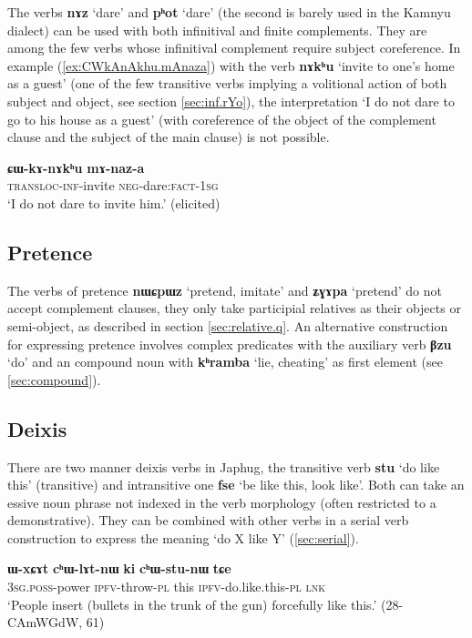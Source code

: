 \documentclass[oneside,a4paper,11pt]{article}
\newcommand{\ipa}[1]{\textbf{\phon#1}} %
\newcommand{\jpg}[2]{\ipa{#1} `#2'} %
\newcommand{\refb}[1]{(\ref{#1})}
\begin{document}
The verbs \jpg{nɤz}{dare} and \jpg{pʰot}{dare} (the second is barely used in the Kamnyu dialect) can be used with both infinitival and finite complements. They are among the few verbs whose infinitival complement require subject coreference. In example \refb{ex:CWkAnAkhu.mAnaza}  with the verb  \jpg{nɤkʰu}{invite to one's home as a guest} (one of the few transitive verbs implying a volitional action of both subject and object, see section \ref{sec:inf.rYo}), the interpretation `I do not dare to go to his house as a guest' (with coreference of the object of the complement clause and the subject of the main clause) is not possible.

\begin{exe}
\ex \label{ex:CWkAnAkhu.mAnaza}
\gll 
\ipa{ɕɯ-kɤ-nɤkʰu} \ipa{mɤ-naz-a} \\
\textsc{transloc-inf}-invite \textsc{neg}-dare:\textsc{fact-1sg} \\
\glt `I do not dare to invite him.' (elicited)
\end{exe}

\subsection{Pretence} \label{sec:pretence}
The verbs of pretence \jpg{nɯɕpɯz}{pretend, imitate} and \jpg{ʑɣɤpa}{pretend} do not accept complement clauses, they only take participial relatives as their objects or semi-object, as described in section \ref{sec:relative.q}. An alternative construction for expressing pretence involves complex predicates with the auxiliary verb \jpg{βzu}{do} and an compound noun with \jpg{kʰramba}{lie, cheating} as first element (see \ref{sec:compound}).

  \subsection{Deixis} \label{sec:deixis}
 There are two manner deixis verbs in Japhug, the transitive verb \jpg{stu}{do like this} (transitive) and intransitive one \jpg{fse}{be like this, look like}. Both can take an essive noun phrase not indexed in the verb morphology (often restricted to a demonstrative). They can be combined with other verbs in a serial verb construction to express the meaning `do X like Y' (\ref{sec:serial}).
 
 \begin{exe}
\ex \label{ex:chWtsunW}
\gll \ipa{ɯ-xɕɤt} 	\ipa{cʰɯ-lɤt-nɯ} 	\ipa{ki} 	\ipa{cʰɯ-stu-nɯ} 	\ipa{tɕe} \\
\textsc{3sg.poss}-power \textsc{ipfv}-throw-\textsc{pl} this  \textsc{ipfv}-do.like.this-\textsc{pl} \textsc{lnk} \\
\glt `People insert (bullets in the trunk of the gun) forcefully like this.' (28-CAmWGdW, 61)
\end{exe}
\end{document}
